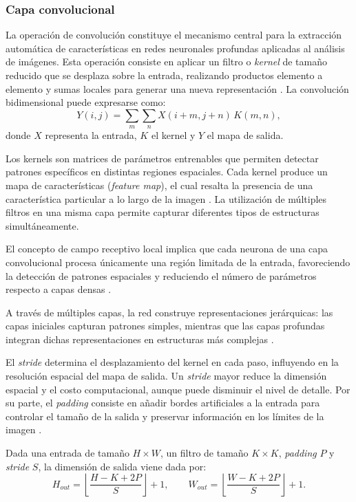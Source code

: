 \subsubsection{Capa convolucional}

La operación de convolución constituye el mecanismo central para la extracción automática de características en redes neuronales profundas aplicadas al análisis de imágenes. Esta operación consiste en aplicar un filtro o \textit{kernel} de tamaño reducido que se desplaza sobre la entrada, realizando productos elemento a elemento y sumas locales para generar una nueva representación \parencite{kaur2021convolutional,farag2023design}. La convolución bidimensional puede expresarse como:
\[
Y(i,j)=\sum_{m}\sum_{n} X(i+m,j+n)\,K(m,n),
\]
donde $X$ representa la entrada, $K$ el kernel y $Y$ el mapa de salida.

Los kernels son matrices de parámetros entrenables que permiten detectar patrones específicos en distintas regiones espaciales. Cada kernel produce un mapa de características (\textit{feature map}), el cual resalta la presencia de una característica particular a lo largo de la imagen \parencite{linse2023predefined,farag2023design}. La utilización de múltiples filtros en una misma capa permite capturar diferentes tipos de estructuras simultáneamente.

El concepto de campo receptivo local implica que cada neurona de una capa convolucional procesa únicamente una región limitada de la entrada, favoreciendo la detección de patrones espaciales y reduciendo el número de parámetros respecto a capas densas \parencite{kaur2021convolutional}.

A través de múltiples capas, la red construye representaciones jerárquicas: las capas iniciales capturan patrones simples, mientras que las capas profundas integran dichas representaciones en estructuras más complejas \parencite{ma2022hyperconvolution,ye2021aksnet}. 

El \textit{stride} determina el desplazamiento del kernel en cada paso, influyendo en la resolución espacial del mapa de salida. Un \textit{stride  }mayor reduce la dimensión espacial y el costo computacional, aunque puede disminuir el nivel de detalle. Por su parte, el \textit{padding} consiste en añadir bordes artificiales a la entrada para controlar el tamaño de la salida y preservar información en los límites de la imagen \parencite{farag2023design,zhou2024optical}.

Dada una entrada de tamaño $H \times W$, un filtro de tamaño $K \times K$, \textit{padding} $P$ y \textit{stride} $S$, la dimensión de salida viene dada por:
\[
H_{out} = \left\lfloor \frac{H - K + 2P}{S} \right\rfloor + 1,
\qquad
W_{out} = \left\lfloor \frac{W - K + 2P}{S} \right\rfloor + 1.
\]

